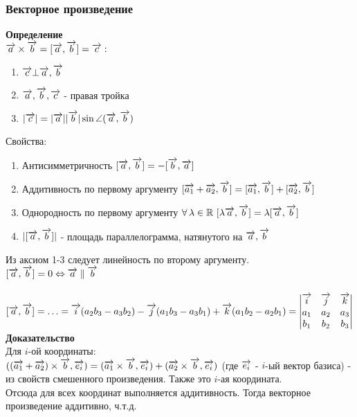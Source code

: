 \documentclass[12pt]{article}
\begin{document}
\subsubsection{Векторное произведение}
\textbf{Определение}\\
$\overrightarrow{a}\times \overrightarrow{b} = [\overrightarrow{a},\overrightarrow{b}] = \overrightarrow{c}:$
\begin{enumerate}
    \item $\overrightarrow{c}\bot\overrightarrow{a},\overrightarrow{b}$
    \item $\overrightarrow{a},\overrightarrow{b},\overrightarrow{c}$ - правая тройка
    \item $|\overrightarrow{c}|=|\overrightarrow{a}||\overrightarrow{b}|\sin \angle(\overrightarrow{a},\overrightarrow{b})$
\end{enumerate}
Свойства:
\begin{enumerate}
    \item Антисимметричность $[\overrightarrow{a},\overrightarrow{b}] = -[\overrightarrow{b},\overrightarrow{a}]$
    \item Аддитивность по первому аргументу $[\overrightarrow{a_1}+\overrightarrow{a_2},\overrightarrow{b}] = [\overrightarrow{a_1},\overrightarrow{b}]+[\overrightarrow{a_2},\overrightarrow{b}]$
    \item Однородность по первому аргументу $\forall\,\lambda \in \mathbb{R}\ [\lambda\vect{a},\vect{b}] = \lambda [\vect{a},\vect{b}]$
    \item $|[\overrightarrow{a},\overrightarrow{b}]|$ - площадь параллелограмма, натянутого на $\overrightarrow{a},\overrightarrow{b}$
\end{enumerate}
Из аксиом 1-3 следует линейность по второму аргументу.\\
$[\overrightarrow{a},\overrightarrow{b}] = 0 \Leftrightarrow \overrightarrow{a} \parallel \overrightarrow{b}$\\\\
$[\overrightarrow{a},\overrightarrow{b}] = \ldots = \overrightarrow{i}(a_2b_3-a_3b_2) -\overrightarrow{j} (a_1b_3-a_3b_1) + \overrightarrow{k}(a_1b_2-a_2b_1)\\ = \begin{vmatrix}
    \overrightarrow{i} & \overrightarrow{j} & \overrightarrow{k} \\
    a_1 & a_2 & a_3 \\
    b_1 & b_2 & b_3
\end{vmatrix}$\\
\textbf{Доказательство}\\
Для $i$-ой координаты:\\
$((\overrightarrow{a_1}+\overrightarrow{a_2})\times \overrightarrow{b}, \overrightarrow{e_i}) = (\overrightarrow{a_1}\times \overrightarrow{b},\overrightarrow{e_i})+(\overrightarrow{a_2}\times \overrightarrow{b},\overrightarrow{e_i})$ (где $\overrightarrow{e_i}$ - $i$-ый вектор базиса) - из свойств смешенного произведения. Также это $i$-ая координата.\\
Отсюда для всех координат выполняется аддитивность. Тогда векторное произведение аддитивно, ч.т.д.
\end{document}
